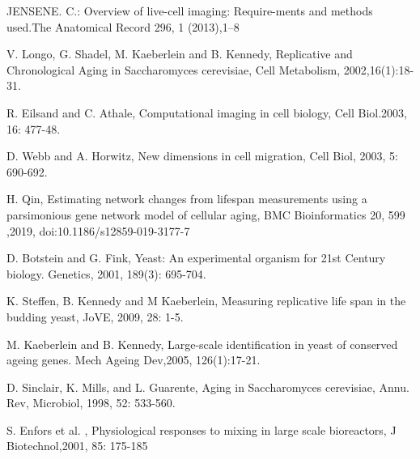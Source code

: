 \documentclass[conference]{IEEEtran}
\begin{document}
\begin{thebibliography}{00}
JENSENE. C.: Overview of live-cell imaging: Require-ments and methods used.The Anatomical Record 296, 1 (2013),1–8


V. Longo, G. Shadel, M. Kaeberlein and B.  Kennedy, Replicative and Chronological Aging in Saccharomyces cerevisiae, Cell Metabolism, 2002,16(1):18-31.





R. Eilsand and C. Athale, Computational imaging in cell biology, Cell Biol.2003, 16: 477-48.






D. Webb and A. Horwitz, New dimensions in cell migration, Cell Biol, 2003,  5: 690-692.


H. Qin, Estimating network changes from lifespan measurements using a parsimonious gene network model of cellular aging, BMC Bioinformatics 20, 599 ,2019, doi:10.1186/s12859-019-3177-7



D. Botstein and G. Fink, Yeast: An experimental organism for 21st Century biology. Genetics, 2001, 189(3): 695-704.



K. Steffen, B. Kennedy and M Kaeberlein, Measuring replicative life span in the budding yeast, JoVE, 2009,  28: 1-5.


M. Kaeberlein and B. Kennedy, Large-scale identification in yeast of conserved ageing genes. Mech Ageing Dev,2005, 126(1):17-21.


D. Sinclair, K. Mills, and L. Guarente,  Aging in Saccharomyces cerevisiae, Annu. Rev,  Microbiol, 1998, 52: 533-560.



S. Enfors  et al. , Physiological responses to mixing in large scale bioreactors, J Biotechnol,2001, 85: 175-185



\end{thebibliography}
\end{document}
